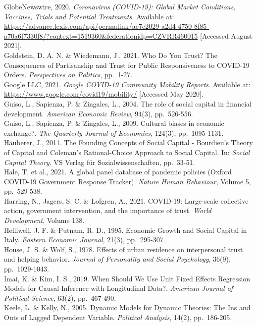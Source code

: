 \documentclass[
  12pt,
]{article}
\begin{document}
GlobeNewswire, 2020. \emph{Coronavirus (COVID-19): Global Market Conditions, Vaccines, Trials and Potential Treatments.} Available at: \url{https://advance.lexis.com/api/permalink/ae7c2029-a2d4-4750-8f85-a70a6f7330f8/?context=1519360\&federationidp=CZVRR460015} {[}Accessed August 2021{]}.\\
Goldstein, D. A. N. \& Wiedemann, J., 2021. Who Do You Trust? The Consequences of Partisanship and Trust for Public Responsiveness to COVID-19 Orders. \emph{Perspectives on Politics}, pp.~1-27.\\
Google LLC, 2021. \emph{Google COVID-19 Community Mobility Reports}. Available at: \url{https://www.google.com/covid19/mobility/} {[}Accessed May 2020{]}.\\
Guiso, L., Sapienza, P. \& Zingales, L., 2004. The role of social capital in financial development. \emph{American Economic Review}, 94(3), pp.~526-556.\\
Guiso, L., Sapienza, P. \& Zingales, L., 2009. Cultural biases in economic exchange?. \emph{The Quarterly Journal of Economics}, 124(3), pp.~1095-1131.\\
Häuberer, J., 2011. The Founding Concepts of Social Capital - Bourdieu's Theory of Capital and Coleman's Rational-Choice Approach to Social Capital. In: \emph{Social Capital Theory}. VS Verlag für Sozialwissenschaften, pp.~33-51.\\
Hale, T. et al., 2021. A global panel database of pandemic policies (Oxford COVID-19 Government Response Tracker). \emph{Nature Human Behaviour}, Volume 5, pp.~529-538.\\
Harring, N., Jagers, S. C. \& Lofgren, A., 2021. COVID-19: Large-scale collective action, government intervention, and the importance of trust. \emph{World Development}, Volume 138.\\
Helliwell, J. F. \& Putnam, R. D., 1995. Economic Growth and Social Capital in Italy. \emph{Eastern Economic Journal}, 21(3), pp.~295-307.\\
House, J. S. \& Wolf, S., 1978. Effects of urban residence on interpersonal trust and helping behavior. \emph{Journal of Personality and Social Psychology}, 36(9), pp.~1029-1043.\\
Imai, K. \& Kim, I. S., 2019. When Should We Use Unit Fixed Effects Regression Models for Causal Inference with Longitudinal Data?. \emph{American Journal of Political Science}, 63(2), pp.~467-490.\\
Keele, L. \& Kelly, N., 2005. Dynamic Models for Dynamic Theories: The Ins and Outs of Lagged Dependent Variable. \emph{Political Analysis}, 14(2), pp.~186-205.\\
\end{document}
